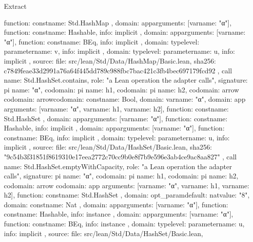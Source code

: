 \begin{lexlean}{Extract}
\begin{toolingmodule}
{{{{{{{{                  function: const{name: Std.HashMap}
                }
              },
              domain: app{arguments: [var{name: "α"}], function: const{name: Hashable}},
              info: implicit
            },
            domain: app{arguments: [var{name: "α"}], function: const{name: BEq}},
            info: implicit
          },
          domain: type{level: parameter{name: v}},
          info: implicit
        },
        domain: type{level: parameter{name: u}},
        info: implicit
      },
      source: {
        file: src/lean/Std/Data/HashMap/Basic.lean,
        sha256: c7849feae33d2991a76a64f445dd789c988fbc7bac421c3fb4bec697179fcd92
      }
    },
    call{
      name: Std.HashSet.contains,
      role: "a Lean operation the adapter calls",
      signature: pi{
        name: "α",
        codomain: pi{
          name: h1,
          codomain: pi{
            name: h2,
            codomain: arrow{
              codomain: arrow{codomain: const{name: Bool}, domain: var{name: "α"}},
              domain: app{
                arguments: [var{name: "α"}, var{name: h1}, var{name: h2}],
                function: const{name: Std.HashSet}
              }
            },
            domain: app{arguments: [var{name: "α"}], function: const{name: Hashable}},
            info: implicit
          },
          domain: app{arguments: [var{name: "α"}], function: const{name: BEq}},
          info: implicit
        },
        domain: type{level: parameter{name: u}},
        info: implicit
      },
      source: {
        file: src/lean/Std/Data/HashSet/Basic.lean,
        sha256: "9c54b3f31851f8619310e17eea2772c70cc9b0e8f7b9e596e3ab4ce9ac8aa827"
      }
    },
    call{
      name: Std.HashSet.emptyWithCapacity,
      role: "a Lean operation the adapter calls",
      signature: pi{
        name: "α",
        codomain: pi{
          name: h1,
          codomain: pi{
            name: h2,
            codomain: arrow{
              codomain: app{
                arguments: [var{name: "α"}, var{name: h1}, var{name: h2}],
                function: const{name: Std.HashSet}
              },
              domain: opt_param{default: nat{value: "8"}, domain: const{name: Nat}}
            },
            domain: app{arguments: [var{name: "α"}], function: const{name: Hashable}},
            info: instance
          },
          domain: app{arguments: [var{name: "α"}], function: const{name: BEq}},
          info: instance
        },
        domain: type{level: parameter{name: u}},
        info: implicit
      },
      source: {
        file: src/lean/Std/Data/HashSet/Basic.lean,
}}}
\end{toolingmodule}
\end{lexlean}
